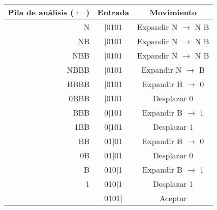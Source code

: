 \documentclass[\main/ApuntesPL.tex]{subfiles}
\begin{document}
    \vspace{5mm}
    \begin{center}
      \begin{tabular}{||r c c||}
        \hline
        Pila de análisis ($\leftarrow$) & Entrada & Movimiento \\ [0.5ex]
        \hline\hline
        N & $\mid$0101 & Expandir N $\rightarrow$ N B\\
        \hline
        NB & $\mid$0101 & Expandir N $\rightarrow$ N B\\
        \hline
        NBB & $\mid$0101 & Expandir N $\rightarrow$ N B\\
        \hline
        NBBB & $\mid$0101 & Expandir N $\rightarrow$ B\\
        \hline
        BBBB & $\mid$0101 & Expandir B $\rightarrow$ 0 \\
        \hline
        0BBB & $\mid$0101 & Desplazar 0\\
        \hline
        BBB & 0$\mid$101 & Expandir B $\rightarrow$ 1\\
        \hline
        1BB & 0$\mid$101 & Desplazar 1\\
        \hline
        BB & 01$\mid$01 & Expandir B $\rightarrow$ 0\\
        \hline
        0B & 01$\mid$01 & Desplazar 0\\
        \hline
        B & 010$\mid$1 & Expandir B $\rightarrow$ 1\\
        \hline
        1 & 010$\mid$1 & Desplazar 1\\
        \hline
        & 0101$\mid$ & Aceptar\\ [1ex]
        \hline
      \end{tabular}
    \end{center}
\end{document}
